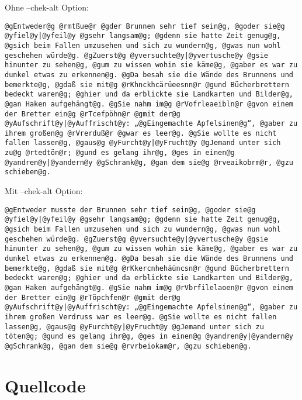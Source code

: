 \documentclass[a4paper,10pt,ngerman]{scrartcl}
\newcommand{\newsection}{\vspace{3\baselineskip}\section}
\begin{document}
Ohne --chek-alt Option:
\begin{lstlisting}
@gEntweder@g @rmtßue@r @gder Brunnen sehr tief sein@g, @goder sie@g @yfiel@y|@yfeil@y @gsehr langsam@g; @gdenn sie hatte Zeit genug@g, @gsich beim Fallen umzusehen und sich zu wundern@g, @gwas nun wohl geschehen würde@g. @gZuerst@g @yversuchte@y|@yvertusche@y @gsie hinunter zu sehen@g, @gum zu wissen wohin sie käme@g, @gaber es war zu dunkel etwas zu erkennen@g. @gDa besah sie die Wände des Brunnens und bemerkte@g, @gdaß sie mit@g @rKhnckhcärüeesnn@r @gund Bücherbrettern bedeckt waren@g; @ghier und da erblickte sie Landkarten und Bilder@g, @gan Haken aufgehängt@g. @gSie nahm im@g @rVofrleaeibln@r @gvon einem der Bretter ein@g @rTcefpöhn@r @gmit der@g @yAufschrift@y|@yAuffrischt@y: „@gEingemachte Apfelsinen@g“, @gaber zu ihrem großen@g @rVrerduß@r @gwar es leer@g. @gSie wollte es nicht fallen lassen@g, @gaus@g @yFurcht@y|@yFrucht@y @gJemand unter sich zu@g @rtedtön@r; @gund es gelang ihr@g, @ges in einen@g @yandren@y|@yandern@y @gSchrank@g, @gan dem sie@g @rveaikobrm@r, @gzu schieben@g.
\end{lstlisting}

Mit --chek-alt Option:
\begin{lstlisting}
@gEntweder musste der Brunnen sehr tief sein@g, @goder sie@g @yfiel@y|@yfeil@y @gsehr langsam@g; @gdenn sie hatte Zeit genug@g, @gsich beim Fallen umzusehen und sich zu wundern@g, @gwas nun wohl geschehen würde@g. @gZuerst@g @yversuchte@y|@yvertusche@y @gsie hinunter zu sehen@g, @gum zu wissen wohin sie käme@g, @gaber es war zu dunkel etwas zu erkennen@g. @gDa besah sie die Wände des Brunnens und bemerkte@g, @gdaß sie mit@g @rKkercnhehäüncsn@r @gund Bücherbrettern bedeckt waren@g; @ghier und da erblickte sie Landkarten und Bilder@g, @gan Haken aufgehängt@g. @gSie nahm im@g @rVbrfilelaoen@r @gvon einem der Bretter ein@g @rTöpchfen@r @gmit der@g @yAufschrift@y|@yAuffrischt@y: „@gEingemachte Apfelsinen@g“, @gaber zu ihrem großen Verdruss war es leer@g. @gSie wollte es nicht fallen lassen@g, @gaus@g @yFurcht@y|@yFrucht@y @gJemand unter sich zu töten@g; @gund es gelang ihr@g, @ges in einen@g @yandren@y|@yandern@y @gSchrank@g, @gan dem sie@g @rvrbeiokam@r, @gzu schieben@g.
\end{lstlisting}

\pagebreak
\newsection{Quellcode}
\end{document}

